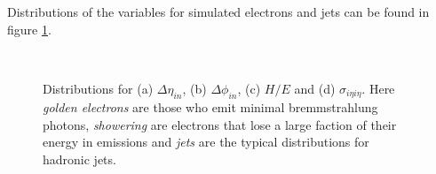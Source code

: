 Distributions of the variables for simulated electrons and jets can be found in figure \ref{FIGURE:PhysicsObjects_Electrons}. 

\begin{figure}[htp]%
\centering
{}\qquad
{}\\
\qquad
{}
\caption[Distributions for the variables $\Delta\eta_{\text in}$, $\Delta\phi_{\text in}$, $\sigma_{i\eta i\eta}$ and $H/E$ for simulated electrons and misidentified jets.]{Distributions for (a) $\Delta\eta_{in}$, (b) $\Delta\phi_{in}$, (c) $H/E$ and (d) $\sigma_{i \eta i \eta}$. Here \textit{golden electrons} are those who emit minimal bremmstrahlung photons, \textit{showering} are electrons that lose a large faction of their energy in emissions and \textit{jets} are the typical distributions for hadronic jets.}
\label{FIGURE:PhysicsObjects_Electrons}
\end{figure}

